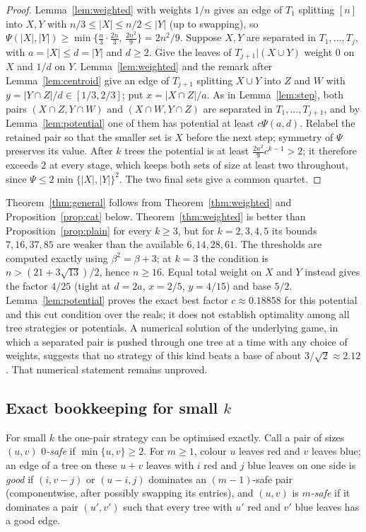 \documentclass[11pt]{amsart}
\theoremstyle{remark}
\begin{document}
\begin{proof}
Lemma~\ref{lem:weighted} with weights $1/n$ gives an edge of $T_1$ splitting $[n]$ into $X,Y$ with $n/3\le|X|\le n/2\le|Y|$ (up to swapping), so $\Psi(|X|,|Y|)\ge\min\{\tfrac n3\cdot\tfrac{2n}3,\,\tfrac{2n^2}9\}=2n^2/9$. Suppose $X,Y$ are separated in $T_1,\dots,T_j$, with $a=|X|\le d=|Y|$ and $d\ge2$. Give the leaves of $T_{j+1}|(X\cup Y)$ weight $0$ on $X$ and $1/d$ on $Y$. Lemma~\ref{lem:weighted} and the remark after Lemma~\ref{lem:centroid} give an edge of $T_{j+1}$ splitting $X\cup Y$ into $Z$ and $W$ with $y=|Y\cap Z|/d\in[1/3,2/3]$; put $x=|X\cap Z|/a$. As in Lemma~\ref{lem:step}, both pairs $(X\cap Z,Y\cap W)$ and $(X\cap W,Y\cap Z)$ are separated in $T_1,\dots,T_{j+1}$, and by Lemma~\ref{lem:potential} one of them has potential at least $c\Psi(a,d)$. Relabel the retained pair so that the smaller set is $X$ before the next step; symmetry of $\Psi$ preserves its value. After $k$ trees the potential is at least $\tfrac{2n^2}9c^{k-1}>2$; it therefore exceeds $2$ at every stage, which keeps both sets of size at least two throughout, since $\Psi\le2\min\{|X|,|Y|\}^2$. The two final sets give a common quartet.
\end{proof}

Theorem~\ref{thm:general} follows from Theorem~\ref{thm:weighted} and Proposition~\ref{prop:cat} below. Theorem~\ref{thm:weighted} is better than Proposition~\ref{prop:plain} for every $k\ge3$, but for $k=2,3,4,5$ its bounds $7,16,37,85$ are weaker than the available $6,14,28,61$. The thresholds are computed exactly using $\beta^2=\beta+3$; at $k=3$ the condition is $n>(21+3\sqrt{13})/2$, hence $n\ge16$. Equal total weight on $X$ and $Y$ instead gives the factor $4/25$ (tight at $d=2a$, $x=2/5$, $y=4/15$) and base $5/2$. Lemma~\ref{lem:potential} proves the exact best factor $c\approx0.18858$ for this potential and this cut condition over the reals; it does not establish optimality among all tree strategies or potentials. A numerical solution of the underlying game, in which a separated pair is pushed through one tree at a time with any choice of weights, suggests that no strategy of this kind beats a base of about $3/\sqrt2\approx2.12$. That numerical statement remains unproved.

\subsection*{\texorpdfstring{Exact bookkeeping for small $k$}{Exact bookkeeping for small k}}
For small $k$ the one-pair strategy can be optimised exactly. Call a pair of sizes $(u,v)$ \emph{$0$-safe} if $\min\{u,v\}\ge2$. For $m\ge1$, colour $u$ leaves red and $v$ leaves blue; an edge of a tree on these $u+v$ leaves with $i$ red and $j$ blue leaves on one side is \emph{good} if $(i,v-j)$ or $(u-i,j)$ dominates an $(m-1)$-safe pair (componentwise, after possibly swapping its entries), and $(u,v)$ is \emph{$m$-safe} if it dominates a pair $(u',v')$ such that every tree with $u'$ red and $v'$ blue leaves has a good edge.
\end{document}
